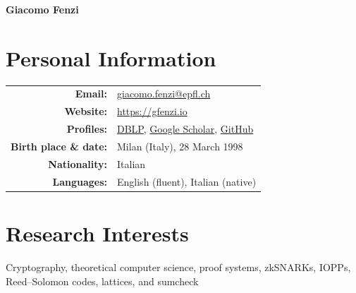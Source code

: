 \documentclass[11pt,a4paper]{article}
\begin{document}
\begin{center}
    {\huge \textbf{Giacomo Fenzi}} \\[0.3em]
\end{center}

\section*{Personal Information}
\begin{tabular}{rl}
  \textbf{Email:} &\href{mailto:giacomo.fenzi@epfl.ch}{giacomo.fenzi@epfl.ch} \\
  \textbf{Website:} &\url{https://gfenzi.io} \\
  \textbf{Profiles:} &\href{https://dblp.org/pid/350/5799.html}{DBLP}, \href{https://scholar.google.com/citations?user=lnJtN4cAAAAJ}{Google Scholar}, \href{https://github.com/WizardOfMenlo}{GitHub} \\
  \textbf{Birth place \& date:} & Milan (Italy), 28 March 1998 \\
  \textbf{Nationality:} & Italian \\
  \textbf{Languages:} & English (fluent), Italian (native) \\
\end{tabular}

\section*{Research Interests}
Cryptography, theoretical computer science, proof systems, zkSNARKs, IOPPs, Reed--Solomon codes, lattices, and sumcheck

\end{document}
